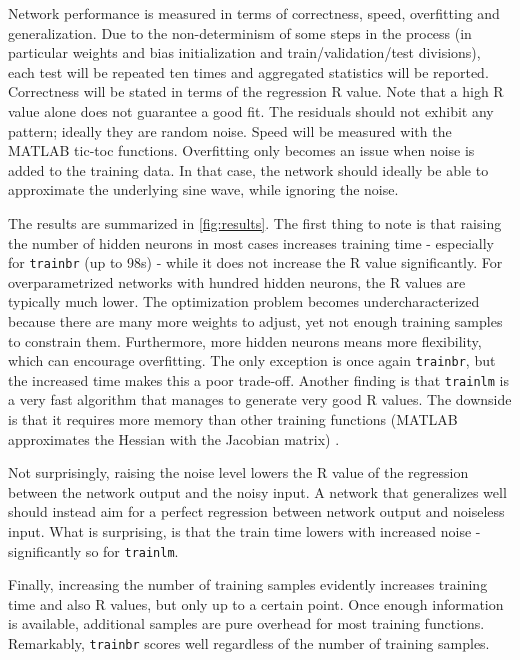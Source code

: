 \documentclass[a4, 10pt, twoside, twocolumn]{article}
\numberwithin{figure}{section}
\begin{document}
Network performance is measured in terms of correctness, speed, overfitting and generalization. Due to the non-determinism of some steps in the process (in particular weights and bias initialization and train/validation/test divisions), each test will be repeated ten times and aggregated statistics will be reported. Correctness will be stated in terms of the regression R value. Note that a high R value alone does not guarantee a good fit. The residuals should not exhibit any pattern; ideally they are random noise. Speed will be measured with the MATLAB tic-toc functions. Overfitting only becomes an issue when noise is added to the training data. In that case, the network should ideally be able to approximate the underlying sine wave, while ignoring the noise.

\afterpage{}

The results are summarized in \autoref{fig:results}. The first thing to note is that raising the number of hidden neurons in most cases increases training time - especially for \texttt{trainbr} (up to 98s) - while it does not increase the R value significantly. For overparametrized networks with hundred hidden neurons, the R values are typically much lower. The optimization problem becomes undercharacterized because there are many more weights to adjust, yet not enough training samples to constrain them. Furthermore, more hidden neurons means more flexibility, which can encourage overfitting. The only exception is once again \texttt{trainbr}, but the increased time makes this a poor trade-off. Another finding is that \texttt{trainlm} is a very fast algorithm that manages to generate very good R values. The downside is that it requires more memory than other training functions (MATLAB approximates the Hessian with the Jacobian matrix) \cite{helptrainlm}.

Not surprisingly, raising the noise level lowers the R value of the regression between the network output and the noisy input. A network that generalizes well should instead aim for a perfect regression between network output and noiseless input. What is surprising, is that the train time lowers with increased noise - significantly so for \texttt{trainlm}.

Finally, increasing the number of training samples evidently increases training time and also R values, but only up to a certain point. Once enough information is available, additional samples are pure overhead for most training functions. Remarkably, \texttt{trainbr} scores well regardless of the number of training samples.
\end{document}
